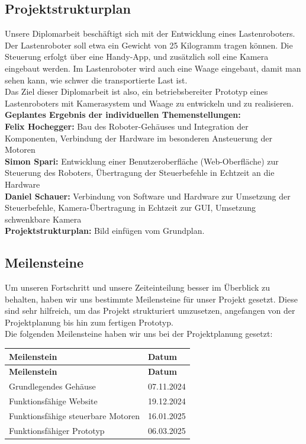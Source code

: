\documentclass[ngerman,12pt,a4paper]{article}
\begin{document}
		\subsection{Projektstrukturplan} %
		Unsere Diplomarbeit beschäftigt sich mit der Entwicklung eines Lastenroboters. Der Lastenroboter soll etwa ein Gewicht von 25 Kilogramm tragen können. Die Steuerung erfolgt über eine Handy-App, und zusätzlich soll eine Kamera eingebaut werden. Im Lastenroboter wird auch eine Waage eingebaut, damit man sehen kann, wie schwer die transportierte Last ist. \\ Das Ziel dieser Diplomarbeit ist also, ein betriebsbereiter Prototyp eines Lastenroboters mit Kamerasystem und Waage zu entwickeln und zu realisieren. \\[0.5cm]
		\textbf{Geplantes Ergebnis der individuellen Themenstellungen:} \\
		\textbf{Felix Hochegger:}
		Bau des Roboter-Gehäuses und Integration der Komponenten, Verbindung der Hardware im besonderen Ansteuerung der Motoren \\
		\textbf{Simon Spari:}
		Entwicklung einer Benutzeroberfläche (Web-Oberfläche) zur Steuerung des Roboters, Übertragung der Steuerbefehle in Echtzeit an die Hardware \\
		\textbf{Daniel Schauer:}
		Verbindung von Software und Hardware zur Umsetzung der Steuerbefehle, Kamera-Übertragung in Echtzeit zur GUI, Umsetzung schwenkbare Kamera\\
		\textbf{Projektstrukturplan:}
		Bild einfügen vom Grundplan.
		\subsection{Meilensteine} %
		Um unseren Fortschritt und unsere Zeiteinteilung besser im Überblick zu behalten, haben wir uns bestimmte Meilensteine für unser Projekt gesetzt. Diese sind sehr hilfreich, um das Projekt strukturiert umzusetzen, angefangen von der Projektplanung bis hin zum fertigen Prototyp. \\[0.5cm]
		Die folgenden Meilensteine haben wir uns bei der Projektplanung gesetzt:
		\begin{longtable}{| l | l |}
			\hline
			\textbf{Meilenstein} & \textbf{Datum} \\
			\hline
			\endfirsthead
			\hline
			\textbf{Meilenstein} & \textbf{Datum} \\
			\hline
			\endhead
			\hline
			Grundlegendes Gehäuse & 07.11.2024 \\
			\hline
			Funktionsfähige Website & 19.12.2024 \\
			\hline
			Funktionsfähige steuerbare Motoren & 16.01.2025 \\
			\hline
			Funktionsfähiger Prototyp & 06.03.2025 \\
			\hline
		\end{longtable}
		\newpage
\end{document}
